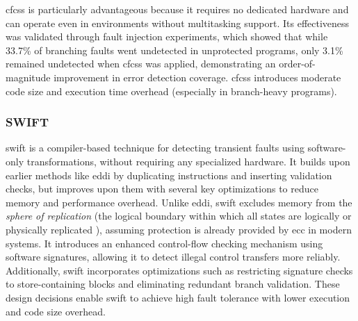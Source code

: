 \acrshort{cfcss} is particularly advantageous because it requires no dedicated hardware and can operate even in environments without multitasking support. Its effectiveness was validated through fault injection experiments, which showed that while 33.7\% of branching faults went undetected in unprotected programs, only 3.1\% remained undetected when \acrshort{cfcss} was applied, demonstrating an order-of-magnitude improvement in error detection coverage. \acrshort{cfcss} introduces moderate code size and execution time overhead (especially in branch-heavy programs).

\subsubsection{SWIFT}

\acrfull{swift} \cite{swift} is a compiler-based technique for detecting transient faults using software-only transformations, without requiring any specialized hardware. It builds upon earlier methods like \acrshort{eddi} by duplicating instructions and inserting validation checks, but improves upon them with several key optimizations to reduce memory and performance overhead. Unlike \acrshort{eddi}, \acrshort{swift} excludes memory from the \textit{sphere of replication} (the logical boundary within which
all states are logically or physically replicated \cite{shubu}), assuming protection is already provided by \acrshort{ecc} in modern systems. It introduces an enhanced control-flow checking mechanism using software signatures, allowing it to detect illegal control transfers more reliably. Additionally, \acrshort{swift} incorporates optimizations such as restricting signature checks to store-containing blocks and eliminating redundant branch validation. These design decisions enable \acrshort{swift} to achieve high fault tolerance with lower execution and code size overhead.